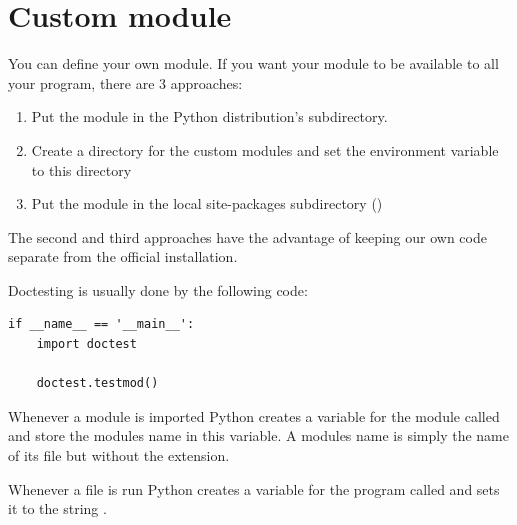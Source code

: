 \section{Custom module}
\label{sec:custom-module}

You can define your own module.
If you want your module to be available to all your program, there are 3 approaches:
\begin{enumerate}
\item Put the module in the Python distribution's  subdirectory.
\item Create a directory for the custom modules and set the  environment variable to this directory
\item Put the module in the local site-packages subdirectory ()
\end{enumerate}


The second and third approaches have the advantage of keeping our own code separate from the official installation.


Doctesting is usually done by the following code:
\begin{lstlisting}
if __name__ == '__main__':
    import doctest

    doctest.testmod()
\end{lstlisting}


Whenever a module is imported Python creates a variable for the module called  and store the modules name in this variable.
A modules name is simply the name of its  file but without the extension.

Whenever a  file is run Python creates a variable for the program called  and sets it to the string .


